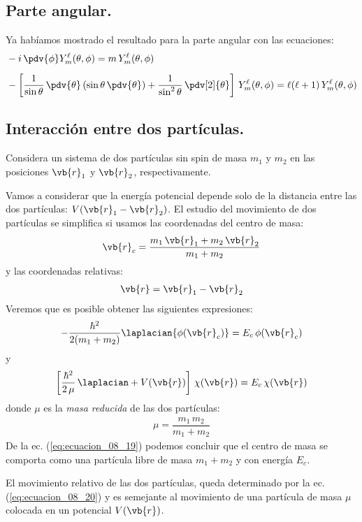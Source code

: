 \subsection{Parte angular.}
Ya habíamos mostrado el resultado para la parte angular con las ecuaciones:
\begin{align}
&-i \,\pdv{\phi} Y_{m}^{\ell} (\theta, \phi) = m \, Y_{m}^{\ell} (\theta, \phi) \label{eq:ecuacion_08_15} \\[0.5em]
&- \left[ \dfrac{1}{\sin \theta} \, \pdv{\theta} \left( \sin \theta \, \pdv{\theta} \right) + \dfrac{1}{\sin^{2} \theta} \, \pdv[2]{\theta} \right] \, Y_{m}^{\ell}(\theta, \phi) = \ell(\ell + 1) \, Y_{m}^{\ell} (\theta, \phi) \label{eq:ecuacion_08_16} 
\end{align}
\subsection{Interacción entre dos partículas.}
Considera un sistema de dos partículas sin spin de masa $m_{1}$ y $m_{2}$ en las posiciones $\vb{r}_{1}$ y $\vb{r}_{2}$, respectivamente.
\par
Vamos a considerar que la energía potencial depende solo de la distancia entre las dos partículas: $V(\vb{r}_{1} - \vb{r}_{2})$. El estudio del movimiento de dos partículas se simplifica si usamos las coordenadas del centro de masa:
\begin{align}
\vb{r}_{c} = \dfrac{m_{1} \, \vb{r}_{1} + m_{2} \, \vb{r}_{2}}{m_{1} + m_{2}}
\label{eq:ecuacion_08_17}
\end{align}
y las coordenadas relativas:
\begin{align}
\vb{r} = \vb{r}_{1} - \vb{r}_{2}
\label{eq:ecuacion_08_18}
\end{align}
Veremos que es posible obtener las siguientes expresiones:
\begin{align}
- \dfrac{\hbar^{2}}{2(m_{1} + m_{2})} \laplacian{\phi (\vb{r}_{c})} = E_{c} \, \phi(\vb{r}_{c})
\label{eq:ecuacion_08_19}
\end{align}
y
\begin{align}
\left[ \dfrac{\hbar^{2}}{2 \, \mu} \, \laplacian + V(\vb{r}) \right] \, \chi (\vb{r}) = E_{c} \, \chi (\vb{r})
\label{eq:ecuacion_08_20}
\end{align}
donde $\mu$ es la \emph{masa reducida} de las dos partículas:
\begin{align}
\mu = \dfrac{m_{1} \, m_{2}}{m_{1} + m_{2}}
\label{eq:ecuacion_08_21}
\end{align}
De la ec. (\ref{eq:ecuacion_08_19}) podemos concluir que el centro de masa se comporta como una partícula libre de masa $m_{1} + m_{2}$ y con energía $E_{c}$.
\par
El movimiento relativo de las dos partículas, queda determinado por la ec. (\ref{eq:ecuacion_08_20}) y es semejante al movimiento de una partícula de masa $\mu$ colocada en un potencial $V (\vb{r})$.
